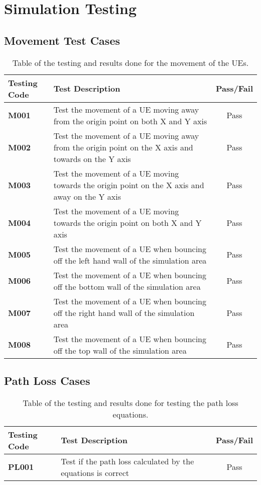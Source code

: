 \chapter{Simulation Testing}\label{testing}
\section{Movement Test Cases}
\begin{table}[H]
  \begin{center}
    \begin{tabular}{| l | p{8cm} | c |}
  	  \hline
      \textbf{Testing Code} & \textbf{Test Description} & \textbf{Pass/Fail} \\ \hline
      \textbf{M001} & Test the movement of a UE moving away from the origin point on both X and Y axis & Pass \\ \hline
      \textbf{M002} & Test the movement of a UE moving away from the origin point on the X axis and towards on the Y axis & Pass \\ \hline
      \textbf{M003} & Test the movement of a UE moving towards the origin point on the X axis and away on the Y axis & Pass \\ \hline
      \textbf{M004} & Test the movement of a UE moving towards the origin point on both X and Y axis & Pass \\ \hline
      \textbf{M005} & Test the movement of a UE when bouncing off the left hand wall of the simulation area & Pass \\ \hline
      \textbf{M006} & Test the movement of a UE when bouncing off the bottom wall of the simulation area & Pass \\ \hline
      \textbf{M007} & Test the movement of a UE when bouncing off the right hand wall of the simulation area & Pass \\ \hline
      \textbf{M008} & Test the movement of a UE when bouncing off the top wall of the simulation area & Pass \\ \hline
  	\end{tabular}
  \end{center}
  \caption{Table of the testing and results done for the movement of the UEs.}
  \label{tab:test_move}
\end{table}

\section{Path Loss Cases}
\begin{table}[H]
  \begin{center}
    \begin{tabular}{| l | p{8cm} | c |}
  	  \hline
      \textbf{Testing Code} & \textbf{Test Description} & \textbf{Pass/Fail} \\ \hline
      \textbf{PL001} & Test if the path loss calculated by the equations is correct & Pass \\ \hline
  	\end{tabular}
  \end{center}
  \caption{Table of the testing and results done for testing the path loss equations.}
  \label{tab:test_pathloss}
\end{table}


